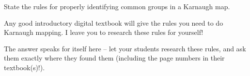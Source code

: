 

State the rules for properly identifying common groups in a Karnaugh map.







Any good introductory digital textbook will give the rules you need to do Karnaugh mapping.  I leave you to research these rules for yourself!







The answer speaks for itself here -- let your students research these rules, and ask them exactly where they found them (including the page numbers in their textbook(s)!).




